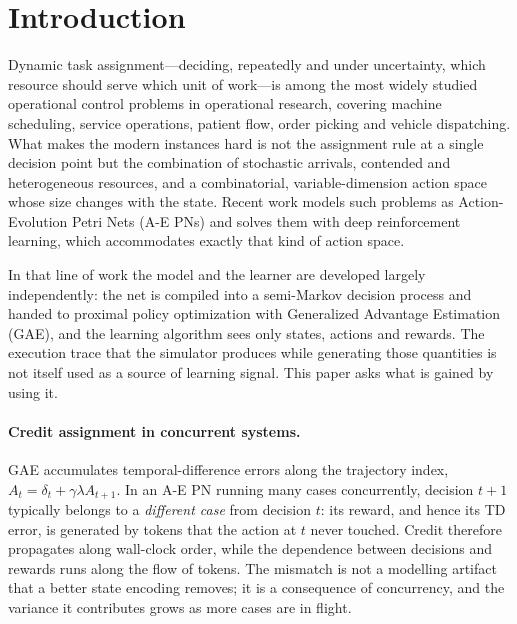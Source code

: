 \documentclass[review,authoryear,3p,times]{elsarticle}
\begin{document}
\section{Introduction}

Dynamic task assignment---deciding, repeatedly and under uncertainty, which
resource should serve which unit of work---is among the most widely studied
operational control problems in operational research, covering machine
scheduling, service operations, patient flow, order picking and vehicle
dispatching. What makes the modern instances hard is not the assignment rule at
a single decision point but the combination of stochastic arrivals, contended
and heterogeneous resources, and a combinatorial, variable-dimension action
space whose size changes with the state. Recent work models such problems as
Action-Evolution Petri Nets (A-E PNs) and solves them with deep reinforcement
learning, which accommodates exactly that kind of action space.

In that line of work the model and the learner are developed largely
independently: the net is compiled into a semi-Markov decision process and
handed to proximal policy optimization with Generalized Advantage Estimation
(GAE), and the learning algorithm sees only states, actions and rewards. The
execution trace that the simulator produces while generating those quantities is
not itself used as a source of learning signal. This paper asks what is gained
by using it.

\paragraph{Credit assignment in concurrent systems.}
GAE accumulates temporal-difference errors along the trajectory index,
$A_t = \delta_t + \gamma\lambda A_{t+1}$. In an A-E PN running many cases
concurrently, decision $t+1$ typically belongs to a \emph{different case} from
decision $t$: its reward, and hence its TD error, is generated by tokens that
the action at $t$ never touched. Credit therefore propagates along wall-clock
order, while the dependence between decisions and rewards runs along the flow of
tokens. The mismatch is not a modelling artifact that a better state encoding
removes; it is a consequence of concurrency, and the variance it contributes
grows as more cases are in flight.
\end{document}
